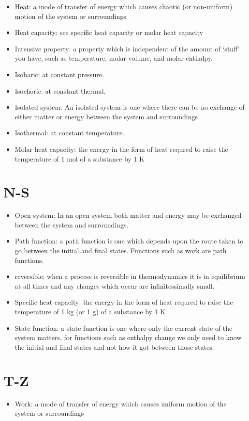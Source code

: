 \documentclass[
]{book}
\providecommand{\tightlist}{%
  \setlength{\itemsep}{0pt}\setlength{\parskip}{0pt}}
\begin{document}
\begin{itemize}
\item
  Heat: a mode of transfer of energy which causes chaotic (or non-uniform) motion of the system or surroundings
\item
  Heat capacity: see specific heat capacity or molar heat capacity
\item
  Intensive property: a property which is independent of the amount of `stuff' you have, such as temperature, molar volume, and molar enthalpy.
\item
  Isobaric: at constant pressure.
\item
  Isochoric: at constant thermal.
\item
  Isolated system: An isolated system is one where there can be no exchange of either matter or energy between the system and surroundings
\item
  Isothermal: at constant temperature.
\item
  Molar heat capacity: the energy in the form of heat requred to raise the temperature of 1 mol of a substance by 1 K
\end{itemize}

\hypertarget{n-s}{%
\section*{N-S}\label{n-s}}

\begin{itemize}
\item
  Open system: In an open system both matter and energy may be exchanged between the system and surroundings.
\item
  Path function: a path function is one which depends upon the route taken to go between the initial and final states. Functions such as work are path functions.
\item
  reversible: when a process is reversible in thermodynamics it is in equilibrium at all times and any changes which occur are infinitessimally small.
\item
  Specific heat capacity: the energy in the form of heat requred to raise the temperature of 1 kg (or 1 g) of a substance by 1 K
\item
  State function: a state function is one where only the current state of the system matters, for functions such as enthalpy change we only need to know the initial and final states and not how it got between those states.
\end{itemize}

\hypertarget{t-z}{%
\section*{T-Z}\label{t-z}}

\begin{itemize}
\tightlist
\item
  Work: a mode of transfer of energy which causes uniform motion of the system or surroundings
\end{itemize}

  
\end{document}
